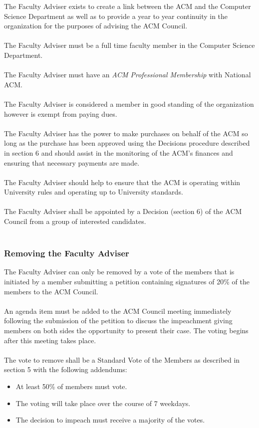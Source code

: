\documentclass[12pt,titlepage]{article}
\begin{document}
The Faculty Adviser exists to create a link between the ACM and the Computer Science Department as well as to provide a year to year continuity in the organization for the purposes of advising the ACM Council.\\
\\
The Faculty Adviser must be a full time faculty member in the Computer Science Department.\\
\\
The Faculty Adviser must have an \emph{ACM Professional Membership} with National ACM.\\
\\
The Faculty Adviser is considered a member in good standing of the organization however is exempt from paying dues.\\
\\
The Faculty Adviser has the power to make purchases on behalf of the ACM so long as the purchase has been approved using the Decisions procedure described in section 6 and should assist in the monitoring of the ACM's finances and ensuring that necessary payments are made.\\
\\
The Faculty Adviser should help to ensure that the ACM is operating within University rules and operating up to University standards.\\
\\
The Faculty Adviser shall be appointed by a Decision (section 6) of the ACM Council from a group of interested candidates.\\
\\
\subsubsection{Removing the Faculty Adviser}
The Faculty Adviser can only be removed by a vote of the members that is initiated by a member submitting a petition containing signatures of 20\% of the members to the ACM Council.\\
\\
An agenda item must be added to the ACM Council meeting immediately following the submission of the petition to discuss the impeachment giving members on both sides the opportunity to present their case. The voting begins after this meeting takes place.\\
\\
The vote to remove shall be a Standard Vote of the Members as described in section 5 with the following addendums:

\begin{itemize}
	\item At least 50\% of members must vote.
	\item The voting will take place over the course of 7 weekdays.
	\item The decision to impeach must receive a majority of the votes.
\end{itemize}
\end{document}
